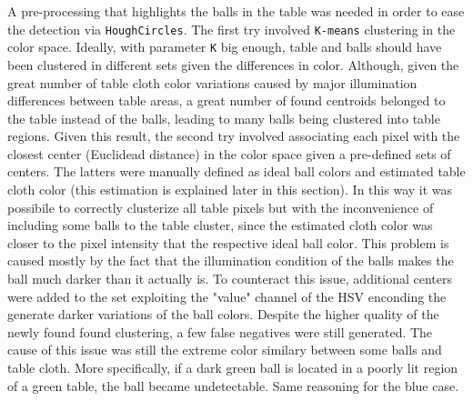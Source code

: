 A pre-processing that highlights the balls in the table was needed in order to ease the detection via \verb|HoughCircles|.
The first try involved \verb|K-means| clustering in the color space. Ideally, with parameter \verb|K| big enough, table and balls should have been
clustered in different sets given the differences in color. Although, given the great number of table cloth color variations caused by major illumination
differences between table areas, a great number of found centroids belonged to the table instead of the balls, leading to many balls being clustered
into table regions. Given this result, the second try involved associating each pixel with the closest center (Euclidead distance) in the color space given a pre-defined sets of centers.
The latters were manually defined as ideal ball colors and estimated table cloth color (this estimation is explained later in this section).
In this way it was possibile to correctly clusterize all table pixels but with the inconvenience of including some balls to the table cluster, since the estimated
cloth color was closer to the pixel intensity that the respective ideal ball color. This problem is caused mostly by the fact that the illumination condition of the balls
makes the ball much darker than it actually is. To counteract this issue, additional centers were added to the set exploiting the "value" channel of the HSV enconding
the generate darker variations of the ball colors. Despite the higher quality of the newly found found clustering, a few false negatives were still generated.
The cause of this issue was still the extreme color similary between some balls and table cloth. More specifically, if a dark green ball is located in a poorly lit 
region of a green table, the ball became undetectable. Same reasoning for the blue case.

